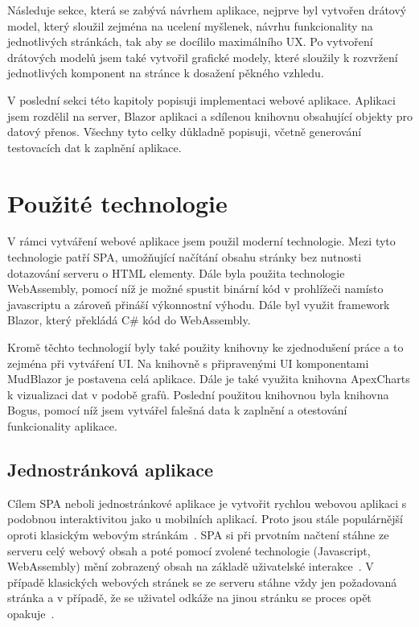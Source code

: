 Následuje sekce, která se zabývá návrhem aplikace, nejprve byl vytvořen drátový model, který sloužil zejména na ucelení myšlenek, návrhu funkcionality na jednotlivých stránkách, tak aby se docílilo maximálního \gls{UX}. Po vytvoření drátových modelů jsem také vytvořil grafické modely, které sloužily k rozvržení jednotlivých komponent na stránce k dosažení pěkného vzhledu.

V poslední sekci této kapitoly popisuji implementaci webové aplikace. Aplikaci jsem rozdělil na server, Blazor aplikaci a sdílenou knihovnu obsahující objekty pro datový přenos. Všechny tyto celky důkladně popisuji, včetně generování testovacích dat k zaplnění aplikace.


\section{Použité technologie}
\label{sec:pouziteTechnologie}
V rámci vytváření webové aplikace jsem použil moderní technologie. Mezi tyto technologie patří \gls{SPA}, umožňující načítání obsahu stránky bez nutnosti dotazování serveru o \gls{HTML} elementy. Dále byla použita technologie WebAssembly, pomocí níž je možné spustit binární kód v prohlížeči namísto javascriptu a zároveň přináší výkonnostní výhodu. Dále byl využit framework Blazor, který překládá C\# kód do WebAssembly. 

Kromě těchto technologií byly také použity knihovny ke zjednodušení práce a to zejména při vytváření \gls{UI}. Na knihovně s připravenými UI komponentami MudBlazor je postavena celá aplikace. Dále je také využita knihovna ApexCharts k vizualizaci dat v podobě grafů. Poslední použitou knihovnou byla knihovna Bogus, pomocí níž jsem vytvářel falešná data k zaplnění a otestování funkcionality aplikace.

    \subsection{Jednostránková aplikace}
    Cílem \gls{SPA} neboli jednostránkové aplikace je vytvořit rychlou webovou aplikaci s podobnou interaktivitou jako u mobilních aplikací. Proto jsou stále populárnější oproti klasickým webovým stránkám~\cite{SPA}. 
    \gls{SPA} si při prvotním načtení stáhne ze serveru celý webový obsah a poté pomocí zvolené technologie (Javascript, WebAssembly) mění zobrazený obsah na základě uživatelské interakce~\cite{mdnWebDoc}. V případě klasických webových stránek se ze serveru stáhne vždy jen požadovaná stránka a v případě, že se uživatel odkáže na jinou stránku se proces opět opakuje~\cite{SPA}.


